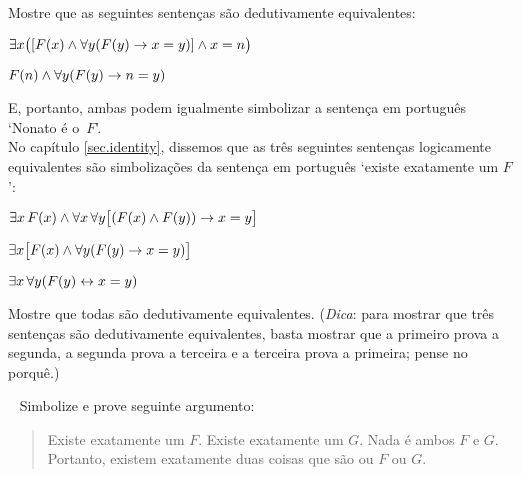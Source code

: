 \problempart
Mostre que as seguintes senten\c cas s\~ao dedutivamente equivalentes:
\begin{ebullet}
\item $\exists x \bigl([\mathord{F}(x) \wedge \forall y (\mathord{F}(y) \rightarrow x = y)] \wedge x = n\bigr)$
\item $\mathord{F}(n) \wedge \forall y (\mathord{F}(y) \rightarrow n= y)$
\end{ebullet}
E, portanto, ambas podem igualmente simbolizar a senten\c ca em portugu\^es `Nonato \'e o~$F$'.\\

\problempart
No cap\'itulo  \ref{sec.identity}, dissemos que as tr\^es seguintes senten\c cas logicamente equivalentes  s\~ao simboliza\c c\~oes da senten\c ca em portugu\^es `existe exatamente um $F$':
\begin{ebullet}
\item $\exists x\,\mathord{F}(x) \wedge \forall x\, \forall y \bigl[(\mathord{F}(x) \wedge \mathord{F}(y)) \rightarrow x = y\bigr]$
\item $\exists x \bigl[\mathord{F}(x) \wedge \forall y (\mathord{F}(y) \rightarrow x = y)\bigr]$
\item $\exists x\, \forall y (\mathord{F}(y) \leftrightarrow x = y)$
\end{ebullet}
Mostre que todas s\~ao dedutivamente equivalentes. (\emph{Dica}: para mostrar que tr\^es senten\c cas s\~ao dedutivamente equivalentes, basta mostrar que a  primeiro  prova a segunda, a segunda prova a terceira e a terceira prova a primeira; pense no porqu\^e.)

\
\problempart
Simbolize e prove seguinte argumento:
	\begin{quote}
		Existe exatamente um $F$. Existe exatamente um $G$. Nada \'e ambos $F$ e $G$. Portanto, existem exatamente duas coisas que  s\~ao ou $F$ ou $G$.
	\end{quote}
 



